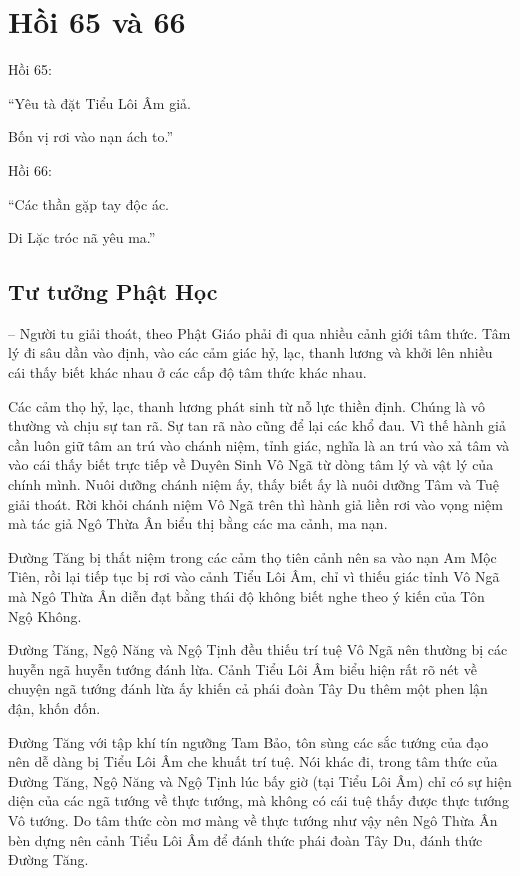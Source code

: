 \chapter{Hồi 65 và 66} %
\label{cha:hoi_65_66}

Hồi 65:

\begin{itshape}
``Yêu tà đặt Tiểu Lôi Âm giả.

Bốn vị rơi vào nạn ách to.''
\end{itshape}

Hồi 66:

\begin{itshape}
``Các thần gặp tay độc ác.

Di Lặc tróc nã yêu ma.''
\end{itshape}

\section{Tư tưởng Phật Học} %
\label{sec:65_66_phat_hoc}

-- Người tu giải thoát, theo Phật Giáo phải đi qua nhiều cảnh giới tâm thức. Tâm lý đi sâu dần vào định, vào các cảm giác hỷ, lạc, thanh lương và khởi lên nhiều cái thấy biết khác nhau ở các cấp độ tâm thức khác nhau.

Các cảm thọ hỷ, lạc, thanh lương phát sinh từ nỗ lực thiền định. Chúng là vô thường và chịu sự tan rã. Sự tan rã nào cũng để lại các khổ đau. Vì thế hành giả cần luôn giữ tâm an trú vào chánh niệm, tỉnh giác, nghĩa là an trú vào xả tâm và vào cái thấy biết trực tiếp về Duyên Sinh Vô Ngã từ dòng tâm lý và vật lý của chính mình. Nuôi dưỡng chánh niệm ấy, thấy biết ấy là nuôi dưỡng Tâm và Tuệ giải thoát. Rời khỏi chánh niệm Vô Ngã trên thì hành giả liền rơi vào vọng niệm mà tác giả Ngô Thừa Ân biểu thị bằng các ma cảnh, ma nạn.

Đường Tăng bị thất niệm trong các cảm thọ tiên cảnh nên sa vào nạn Am Mộc Tiên, rồi lại tiếp tục bị rơi vào cảnh Tiểu Lôi Âm, chỉ vì thiếu giác tỉnh Vô Ngã mà Ngô Thừa Ân diễn đạt bằng thái độ không biết nghe theo ý kiến của Tôn Ngộ Không.

Đường Tăng, Ngộ Năng và Ngộ Tịnh đều thiếu trí tuệ Vô Ngã nên thường bị các huyễn ngã huyễn tướng đánh lừa. Cảnh Tiểu Lôi Âm biểu hiện rất rõ nét về chuyện ngã tướng đánh lừa ấy khiến cả phái đoàn Tây Du thêm một phen lận đận, khốn đốn.

Đường Tăng với tập khí tín ngưỡng Tam Bảo, tôn sùng các sắc tướng của đạo nên dễ dàng bị Tiểu Lôi Âm che khuất trí tuệ. Nói khác đi, trong tâm thức của Đường Tăng, Ngộ Năng và Ngộ Tịnh lúc bấy giờ (tại Tiểu Lôi Âm) chỉ có sự hiện diện của các ngã tướng về thực tướng, mà không có cái tuệ thấy được thực tướng Vô tướng. Do tâm thức còn mơ màng về thực tướng như vậy nên Ngô Thừa Ân bèn dựng nên cảnh Tiểu Lôi Âm để đánh thức phái đoàn Tây Du, đánh thức Đường Tăng.


